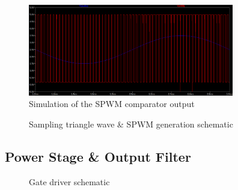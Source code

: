 \documentclass[a4paper,11pt]{article}
\begin{document}
\begin{figure}[h!]
    \centering
    \includegraphics[width=0.8\textwidth]{simulation/spwm_out.png}
    \caption{Simulation of the SPWM comparator output}
\end{figure}

\begin{figure}[h!]
    \centering
    \caption{Sampling triangle wave \& SPWM generation schematic}
\end{figure}

\subsection{Power Stage \& Output Filter}

\begin{figure}[h!]
    \centering
    \caption{Gate driver schematic}
\end{figure}
\end{document}
